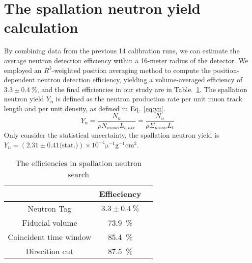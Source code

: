 \section{The spallation neutron yield calculation}
By combining data from the previous 14 calibration runs, we can estimate the average neutron detection efficiency within a 16-meter radius of the detector. We employed an $R^3$-weighted position averaging method to compute the position-dependent neutron detection efficiency, yielding a volume-averaged efficiency of $3.3\pm\SI{0.4}{\%}$, and the final efficiencies in our study are in Table.~\ref{tab:spn_eff}.
The spallation neutron yield $Y_n$ is defined as the neutron production rate per unit muon track length and per unit density, as defined in Eq.~\eqref{eq:yn}.
\begin{equation}
	\label{eq:yn}
	Y_n = \frac{N_n}{\rho N_{muon}L_{t,ave}}= \frac{N_n}{\rho \Sigma_{muon} L_t}
\end{equation}
Only consider the statistical uncertainty, the spallation neutron yield is $Y_n = (2.31\pm0.41 \text{(stat.)})\times 10^{-4} \mathrm{\mu}^{-1}\text{g}^{-1}\text{cm}^2$.
\begin{table}[H]
	\caption{The efficiencies in spallation neutron search}%
	\label{tab:spn_eff}
	\centering%
	\begin{tabular}{ccc}
		\toprule%
		                       & Effieciency          \\
		\midrule%
		Neutron Tag            & $3.3\pm\SI{0.4}{\%}$ \\
		Fiducial volume        & \SI{73.9}{\%}        \\
		Coincident time window & \SI{85.4}{\%}        \\
		Direcition cut         & \SI{87.5}{\%}        \\
		\bottomrule
	\end{tabular}
\end{table}

